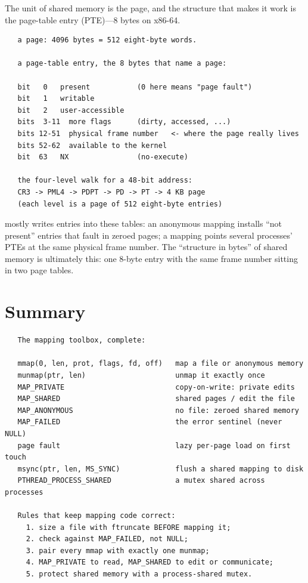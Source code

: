 The unit of shared memory is the page, and the structure that makes it
work is the page-table entry (PTE)---8 bytes on x86-64.

\begin{verbatim}
   a page: 4096 bytes = 512 eight-byte words.

   a page-table entry, the 8 bytes that name a page:

   bit   0   present           (0 here means "page fault")
   bit   1   writable
   bit   2   user-accessible
   bits  3-11  more flags      (dirty, accessed, ...)
   bits 12-51  physical frame number   <- where the page really lives
   bits 52-62  available to the kernel
   bit  63   NX                (no-execute)

   the four-level walk for a 48-bit address:
   CR3 -> PML4 -> PDPT -> PD -> PT -> 4 KB page
   (each level is a page of 512 eight-byte entries)
\end{verbatim}

 mostly writes entries into these tables: an anonymous
mapping installs ``not present'' entries that fault in zeroed pages; a
 mapping points several processes' PTEs at the same
physical frame number. The ``structure in bytes'' of shared memory is
ultimately this: one 8-byte entry with the same frame number sitting in
two page tables.

\section{Summary}

\begin{verbatim}
   The mapping toolbox, complete:

   mmap(0, len, prot, flags, fd, off)   map a file or anonymous memory
   munmap(ptr, len)                     unmap it exactly once
   MAP_PRIVATE                          copy-on-write: private edits
   MAP_SHARED                           shared pages / edit the file
   MAP_ANONYMOUS                        no file: zeroed shared memory
   MAP_FAILED                           the error sentinel (never NULL)
   page fault                           lazy per-page load on first touch
   msync(ptr, len, MS_SYNC)             flush a shared mapping to disk
   PTHREAD_PROCESS_SHARED               a mutex shared across processes

   Rules that keep mapping code correct:
     1. size a file with ftruncate BEFORE mapping it;
     2. check against MAP_FAILED, not NULL;
     3. pair every mmap with exactly one munmap;
     4. MAP_PRIVATE to read, MAP_SHARED to edit or communicate;
     5. protect shared memory with a process-shared mutex.
\end{verbatim}

